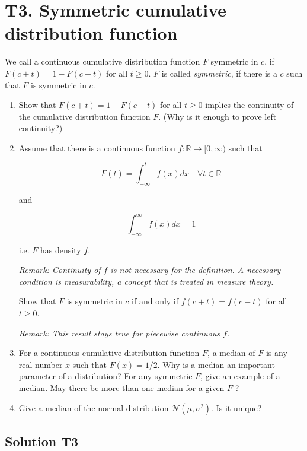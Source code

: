 \documentclass[12pt]{article}
\begin{document}
  


\section*{T3. Symmetric cumulative distribution function}
 We call a continuous cumulative distribution function $F$ symmetric in $c$, if $F(c+t)=1-F(c-t)$ for all $t \geq 0 $. $F$ is called \textit{symmetric}, if there is a $c$ such that $F$ is symmetric in $c$.

 \begin{enumerate}
    
 

    \item  Show that $F(c+t)=1-F(c-t)$ for all $t \geq 0$ implies the continuity of the cumulative distribution function $F$. (Why is it enough to prove left continuity?)

    \item  Assume that there is a continuous function $f: \mathbb{R} \rightarrow[0, \infty)$ such that

$$
F(t)=\int_{-\infty}^{t} f(x) d x \quad \forall t \in \mathbb{R}
$$

and

$$
\int_{-\infty}^{\infty} f(x) d x=1
$$

i.e. $F$ has density $f$.

\textit{Remark: Continuity of $f$ is not necessary for the definition. A necessary condition is measurability, a concept that is treated in measure theory.}

Show that $F$ is symmetric in $c$ if and only if $f(c+t)=f(c-t)$ for all $t \geq 0$.

\textit{Remark: This result stays true for piecewise continuous $f$.}

\item  For a continuous cumulative distribution function $F$, a median of $F$ is any real number $x$ such that $F(x)=1 / 2$. Why is a median an important parameter of a distribution? For any symmetric $F$, give an example of a median. May there be more than one median for a given $F$ ?

\item  Give a median of the normal distribution $\mathcal{N}\left(\mu, \sigma^{2}\right)$. Is it unique?
\end{enumerate}
\subsection*{Solution T3}
   
\end{document}
